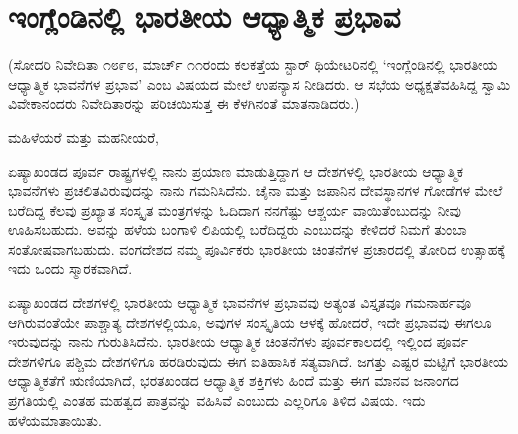 
\chapter{ಇಂಗ್ಲೆಂಡಿನಲ್ಲಿ ಭಾರತೀಯ ಆಧ್ಯಾತ್ಮಿಕ ಪ್ರಭಾವ}

(ಸೋದರಿ ನಿವೇದಿತಾ ೧೮೯೮, ಮಾರ್ಚ್​ ೧೧ರಂದು ಕಲಕತ್ತೆಯ ಸ್ಟಾರ್​ ಥಿಯೇಟರಿನಲ್ಲಿ ‘ಇಂಗ್ಲೆಂಡಿನಲ್ಲಿ ಭಾರತೀಯ ಆಧ್ಯಾತ್ಮಿಕ ಭಾವನೆಗಳ ಪ್ರಭಾವ’ ಎಂಬ ವಿಷಯದ ಮೇಲೆ ಉಪನ್ಯಾಸ ನೀಡಿದರು. ಆ ಸಭೆಯ ಅಧ್ಯಕ್ಷತೆ\break ವಹಿಸಿದ್ದ ಸ್ವಾಮಿ ವಿವೇಕಾನಂದರು ನಿವೇದಿತಾರನ್ನು ಪರಿಚಯಿಸುತ್ತ ಈ ಕೆಳಗಿನಂತೆ ಮಾತನಾಡಿದರು.)

ಮಹಿಳೆಯರೆ ಮತ್ತು ಮಹನೀಯರೆ,

ಏಷ್ಯಾಖಂಡದ ಪೂರ್ವ ರಾಷ್ಟ್ರಗಳಲ್ಲಿ ನಾನು ಪ್ರಯಾಣ ಮಾಡುತ್ತಿದ್ದಾಗ ಆ ದೇಶಗಳಲ್ಲಿ ಭಾರತೀಯ ಆಧ್ಯಾತ್ಮಿಕ ಭಾವನೆಗಳು ಪ್ರಚಲಿತವಿರುವುದನ್ನು ನಾನು ಗಮನಿಸಿದೆನು. ಚೈನಾ ಮತ್ತು ಜಪಾನಿನ ದೇವಸ್ಥಾನಗಳ ಗೋಡೆಗಳ ಮೇಲೆ ಬರೆದಿದ್ದ ಕೆಲವು ಪ್ರಖ್ಯಾತ ಸಂಸ್ಕೃತ ಮಂತ್ರಗಳನ್ನು ಓದಿದಾಗ ನನಗೆಷ್ಟು ಆಶ್ಚರ್ಯ ವಾಯಿತೆಂಬುದನ್ನು ನೀವು ಊಹಿಸಬಹುದು. ಅವನ್ನು ಹಳೆಯ ಬಂಗಾಳಿ ಲಿಪಿಯಲ್ಲಿ ಬರೆದಿದ್ದರು ಎಂಬುದನ್ನು ಕೇಳಿದರೆ ನಿಮಗೆ ತುಂಬಾ ಸಂತೋಷವಾಗಬಹುದು. ವಂಗದೇಶದ ನಮ್ಮ ಪೂರ್ವಿಕರು ಭಾರತೀಯ ಚಿಂತನೆಗಳ ಪ್ರಚಾರದಲ್ಲಿ ತೋರಿದ ಉತ್ಸಾಹಕ್ಕೆ ಇದು ಒಂದು ಸ್ಮಾರಕವಾಗಿದೆ.

ಏಷ್ಯಾಖಂಡದ ದೇಶಗಳಲ್ಲಿ ಭಾರತೀಯ ಆಧ್ಯಾತ್ಮಿಕ ಭಾವನೆಗಳ ಪ್ರಭಾವವು ಅತ್ಯಂತ ವಿಸ್ತೃತವೂ ಗಮನಾರ್ಹವೂ ಆಗಿರುವಂತೆಯೇ ಪಾಶ್ಚಾತ್ಯ ದೇಶಗಳಲ್ಲಿಯೂ, ಅವುಗಳ ಸಂಸ್ಕೃತಿಯ ಆಳಕ್ಕೆ ಹೋದರೆ, ಇದೇ ಪ್ರಭಾವವು ಈಗಲೂ ಇರುವುದನ್ನು ನಾನು ಗುರುತಿಸಿದೆನು. ಭಾರತೀಯ ಆಧ್ಯಾತ್ಮಿಕ ಚಿಂತನೆಗಳು ಪೂರ್ವಕಾಲದಲ್ಲಿ ಇಲ್ಲಿಂದ ಪೂರ್ವ ದೇಶಗಳಿಗೂ ಪಶ್ಚಿಮ ದೇಶಗಳಿಗೂ ಹರಡಿರು\-ವುದು ಈಗ ಐತಿಹಾಸಿಕ ಸತ್ಯವಾಗಿದೆ. ಜಗತ್ತು ಎಷ್ಟರ ಮಟ್ಟಿಗೆ ಭಾರತೀಯ ಆಧ್ಯಾತ್ಮಿಕತೆಗೆ ಋಣಿಯಾಗಿದೆ, ಭರತಖಂಡದ ಆಧ್ಯಾತ್ಮಿಕ ಶಕ್ತಿಗಳು ಹಿಂದೆ ಮತ್ತು ಈಗ ಮಾನವ ಜನಾಂಗದ ಪ್ರಗತಿಯಲ್ಲಿ ಎಂತಹ ಮಹತ್ವದ ಪಾತ್ರವನ್ನು ವಹಿಸಿವೆ ಎಂಬುದು ಎಲ್ಲರಿಗೂ ತಿಳಿದ ವಿಷಯ. ಇದು ಹಳೆಯ\break ಮಾತಾಯಿತು.

